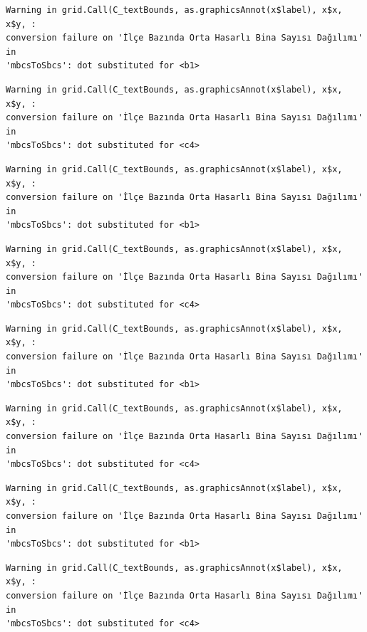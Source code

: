 \documentclass[
  11pt,
  a4paper,
  DIV=11,
  numbers=noendperiod]{scrartcl}
\begin{document}
\begin{verbatim}
Warning in grid.Call(C_textBounds, as.graphicsAnnot(x$label), x$x, x$y, :
conversion failure on 'İlçe Bazında Orta Hasarlı Bina Sayısı Dağılımı' in
'mbcsToSbcs': dot substituted for <b1>
\end{verbatim}

\begin{verbatim}
Warning in grid.Call(C_textBounds, as.graphicsAnnot(x$label), x$x, x$y, :
conversion failure on 'İlçe Bazında Orta Hasarlı Bina Sayısı Dağılımı' in
'mbcsToSbcs': dot substituted for <c4>
\end{verbatim}

\begin{verbatim}
Warning in grid.Call(C_textBounds, as.graphicsAnnot(x$label), x$x, x$y, :
conversion failure on 'İlçe Bazında Orta Hasarlı Bina Sayısı Dağılımı' in
'mbcsToSbcs': dot substituted for <b1>
\end{verbatim}

\begin{verbatim}
Warning in grid.Call(C_textBounds, as.graphicsAnnot(x$label), x$x, x$y, :
conversion failure on 'İlçe Bazında Orta Hasarlı Bina Sayısı Dağılımı' in
'mbcsToSbcs': dot substituted for <c4>
\end{verbatim}

\begin{verbatim}
Warning in grid.Call(C_textBounds, as.graphicsAnnot(x$label), x$x, x$y, :
conversion failure on 'İlçe Bazında Orta Hasarlı Bina Sayısı Dağılımı' in
'mbcsToSbcs': dot substituted for <b1>
\end{verbatim}

\begin{verbatim}
Warning in grid.Call(C_textBounds, as.graphicsAnnot(x$label), x$x, x$y, :
conversion failure on 'İlçe Bazında Orta Hasarlı Bina Sayısı Dağılımı' in
'mbcsToSbcs': dot substituted for <c4>
\end{verbatim}

\begin{verbatim}
Warning in grid.Call(C_textBounds, as.graphicsAnnot(x$label), x$x, x$y, :
conversion failure on 'İlçe Bazında Orta Hasarlı Bina Sayısı Dağılımı' in
'mbcsToSbcs': dot substituted for <b1>
\end{verbatim}

\begin{verbatim}
Warning in grid.Call(C_textBounds, as.graphicsAnnot(x$label), x$x, x$y, :
conversion failure on 'İlçe Bazında Orta Hasarlı Bina Sayısı Dağılımı' in
'mbcsToSbcs': dot substituted for <c4>
\end{verbatim}
\end{document}
